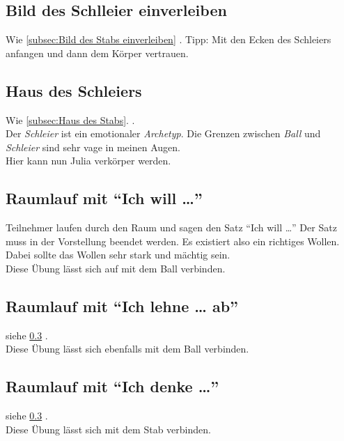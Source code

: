 \documentclass[ngerman, a4paper, twoside]{scrbook}%
\begin{document}
	\subsection{Bild des Schlleier einverleiben}
	Wie \ref{subsec:Bild des Stabs einverleiben} . Tipp: Mit den Ecken des Schleiers anfangen und dann dem Körper vertrauen.
	\subsection{Haus des Schleiers}
	Wie \ref{subsec:Haus des Stabs}. .\\
	Der \emph{Schleier} ist ein emotionaler \emph{Archetyp}. Die Grenzen zwischen \emph{Ball} und \emph{Schleier} sind sehr vage in meinen Augen.\\
	Hier kann nun Julia verkörper werden.

	\vspace{0.5cm}

	\subsection{Raumlauf mit "`Ich will …"'} \label{subsec:Ich will}
	Teilnehmer laufen durch den Raum und sagen den Satz "`Ich will …"' Der Satz muss in der Vorstellung beendet werden. Es existiert also ein richtiges Wollen. Dabei sollte das Wollen sehr stark und mächtig sein.\\
	Diese Übung lässt sich auf mit dem Ball verbinden.\\
	\subsection{Raumlauf mit "`Ich lehne … ab"'}
	siehe \ref{subsec:Ich will} . \\
	Diese Übung lässt sich ebenfalls mit dem Ball verbinden.
	\subsection{Raumlauf mit "`Ich denke …"'}
	siehe \ref{subsec:Ich will} .\\
	Diese Übung lässt sich mit dem Stab verbinden.\\

	\vspace{1cm}
\end{document}
